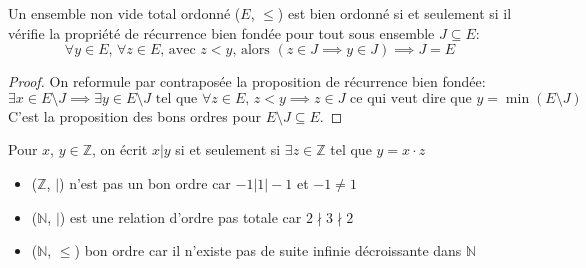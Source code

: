 \begin{prop}

	Un ensemble non vide total ordonné ($E$, $\leqslant$) est bien ordonné si et seulement si il vérifie la propriété de récurrence bien fondée pour tout sous ensemble $J \subseteq E$:
	\begin{equation*}
		\forall y \in E \text{, } \forall z \in E \text{, avec } z < y \text{, alors } (z \in J \implies y \in J) \implies J = E
	\end{equation*}
	\noindent

\end{prop}

\begin{proof}

	On reformule par contraposée la proposition de récurrence bien fondée:
	\begin{equation*}
		\exists x \in E\setminus J \implies \exists y \in E\setminus J \text{ tel que } \forall z \in E \text{, } z < y \implies z \in J \text{ ce qui veut dire que } y = \min(E\setminus J)
	\end{equation*}
	\noindent
	C'est la proposition des bons ordres pour $E\setminus J \subseteq E$.

\end{proof}

\begin{example}
	Pour $x$, $y \in \mathbb{Z}$, on écrit $x | y$ si et seulement si $\exists z \in \mathbb{Z}$ tel que $y = x\cdot z$
	\begin{itemize}
		\item ($\mathbb{Z}$, $|$) n'est pas un bon ordre car $-1 | 1 | -1$ et $-1 \neq 1$
		\item ($\mathbb{N}$, $|$) est une relation d'ordre pas totale car $2 \nmid 3 \nmid 2$
		\item ($\mathbb{N}$, $\leqslant$) bon ordre car il n'existe pas de suite infinie décroissante dans $\mathbb{N}$
	\end{itemize}
\end{example}

